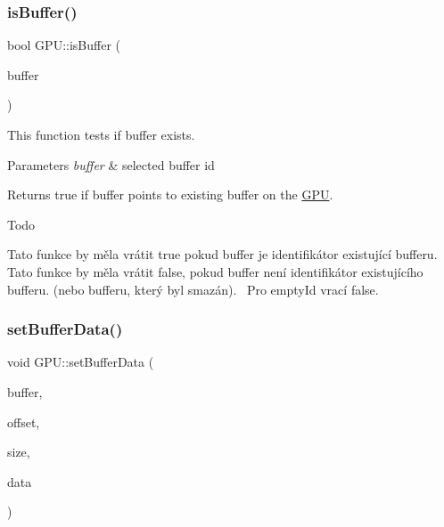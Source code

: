 \subsubsection{\texorpdfstring{is\+Buffer()}{isBuffer()}}
{\footnotesize\ttfamily bool G\+P\+U\+::is\+Buffer (\begin{DoxyParamCaption}\item[{\hyperlink{fwd_8hpp_a5114031b77b80ad895eff688720b7f93}{Buffer\+ID}}]{buffer }\end{DoxyParamCaption})}



This function tests if buffer exists. 


\begin{DoxyParams}{Parameters}
{\em buffer} & selected buffer id\\
\hline
\end{DoxyParams}
\begin{DoxyReturn}{Returns}
true if buffer points to existing buffer on the \hyperlink{classGPU}{G\+PU}. 
\end{DoxyReturn}
\begin{DoxyRefDesc}{Todo}
\item[\hyperlink{todo__todo000007}{Todo}]Tato funkce by měla vrátit true pokud buffer je identifikátor existující bufferu.~\newline
 Tato funkce by měla vrátit false, pokud buffer není identifikátor existujícího bufferu. (nebo bufferu, který byl smazán).~\newline
 Pro empty\+Id vrací false.~\newline
 \end{DoxyRefDesc}
\mbox{\label{group__buffer__tasks_ga97e1e76065fd913d6624b4c03164dcec}} 
\subsubsection{\texorpdfstring{set\+Buffer\+Data()}{setBufferData()}}
{\footnotesize\ttfamily void G\+P\+U\+::set\+Buffer\+Data (\begin{DoxyParamCaption}\item[{\hyperlink{fwd_8hpp_a5114031b77b80ad895eff688720b7f93}{Buffer\+ID}}]{buffer,  }\item[{uint64\+\_\+t}]{offset,  }\item[{uint64\+\_\+t}]{size,  }\item[{void const $\ast$}]{data }\end{DoxyParamCaption})}



